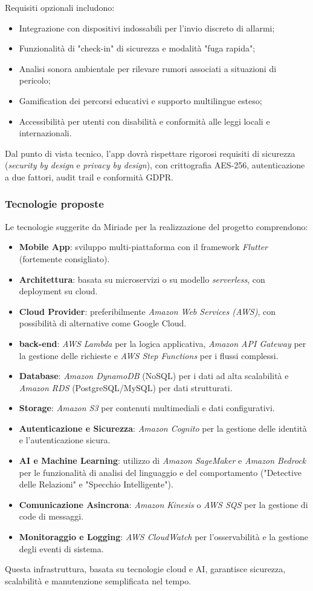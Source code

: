 \documentclass[a4paper,11pt]{article}
\begin{document}
Requisiti opzionali includono:
\begin{itemize}
  \item Integrazione con dispositivi indossabili per l'invio discreto di allarmi;
  \item Funzionalità di "check-in" di sicurezza e modalità "fuga rapida";
  \item Analisi sonora ambientale per rilevare rumori associati a situazioni di pericolo;
  \item Gamification dei percorsi educativi e supporto multilingue esteso;
  \item Accessibilità per utenti con disabilità e conformità alle leggi locali e internazionali.
\end{itemize}
Dal punto di vista tecnico, l'app dovrà rispettare rigorosi requisiti di sicurezza (\textit{security by design} e \textit{privacy by design}), con crittografia AES-256, autenticazione a due fattori, audit trail e conformità GDPR.

\subsubsection{Tecnologie proposte}
Le tecnologie suggerite da Miriade per la realizzazione del progetto comprendono:
\begin{itemize}
  \item \textbf{Mobile App}: sviluppo multi-piattaforma con il framework \textit{Flutter} (fortemente consigliato).
  \item \textbf{Architettura}: basata su microservizi o su modello \textit{serverless}, con deployment su cloud.
  \item \textbf{Cloud Provider}: preferibilmente \textit{Amazon Web Services (AWS)}, con possibilità di alternative come Google Cloud.
  \item \textbf{back-end}: \textit{AWS Lambda} per la logica applicativa, \textit{Amazon API Gateway} per la gestione delle richieste e \textit{AWS Step Functions} per i flussi complessi.
  \item \textbf{Database}: \textit{Amazon DynamoDB} (NoSQL) per i dati ad alta scalabilità e \textit{Amazon RDS} (PostgreSQL/MySQL) per dati strutturati.
  \item \textbf{Storage}: \textit{Amazon S3} per contenuti multimediali e dati configurativi.
  \item \textbf{Autenticazione e Sicurezza}: \textit{Amazon Cognito} per la gestione delle identità e l'autenticazione sicura.
  \item \textbf{AI e Machine Learning}: utilizzo di \textit{Amazon SageMaker} e \textit{Amazon Bedrock} per le funzionalità di analisi del linguaggio e del comportamento ("Detective delle Relazioni" e "Specchio Intelligente").
  \item \textbf{Comunicazione Asincrona}: \textit{Amazon Kinesis} o \textit{AWS SQS} per la gestione di code di messaggi.
  \item \textbf{Monitoraggio e Logging}: \textit{AWS CloudWatch} per l'osservabilità e la gestione degli eventi di sistema.
\end{itemize}
Questa infrastruttura, basata su tecnologie cloud e AI, garantisce sicurezza, scalabilità e manutenzione semplificata nel tempo.
\end{document}

